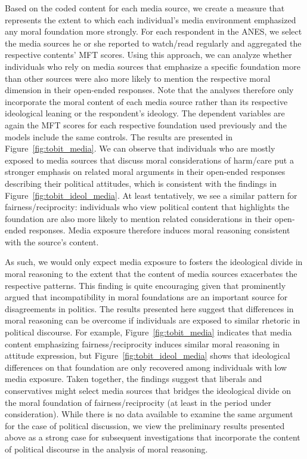 \documentclass[12pt]{article}
\begin{document}
Based on the coded content for each media source, we create a measure that represents the extent to which each individual's media environment emphasized any moral foundation more strongly. For each respondent in the ANES, we select the media sources he or she reported to watch/read regularly and aggregated the respective contents' MFT scores. Using this approach, we can analyze whether individuals who rely on media sources that emphasize a specific foundation more than other sources were also more likely to mention the respective moral dimension in their open-ended responses. Note that the analyses therefore only incorporate the moral content of each media source rather than its respective ideological leaning or the respondent's ideology.  The dependent variables are again the MFT scores for each respective foundation used previously and the models include the same controls. The results are presented in Figure~\ref{fig:tobit_media}. We can observe that individuals who are mostly exposed to media sources that discuss moral considerations of harm/care put a stronger emphasis on related moral arguments in their open-ended responses describing their political attitudes, which is consistent with the findings in Figure~\ref{fig:tobit_ideol_media}. At least tentatively, we see a similar pattern for fairness/reciprocity: individuals who view political content that highlights the foundation are also more likely to mention related considerations in their open-ended responses. Media exposure therefore induces moral reasoning consistent with the source's content.

As such, we would only expect media exposure to fosters the ideological divide in moral reasoning to the extent that the content of media sources exacerbates the respective patterns. This finding is quite encouraging given that \citet{haidt2012righteous} prominently argued that incompatibility in moral foundations are an important source for disagreements in politics. The results presented here suggest that differences in moral reasoning can be overcome if individuals are exposed to similar rhetoric in political discourse. For example, Figure~\ref{fig:tobit_media} indicates that media content emphasizing fairness/reciprocity induces similar moral reasoning in attitude expression, but Figure~\ref{fig:tobit_ideol_media} shows that ideological differences on that foundation are only recovered among individuals with low media exposure. Taken together, the findings suggest that liberals and conservatives might select media sources that bridges the ideological divide on the moral foundation of fairness/reciprocity (at least in the period under consideration). While there is no data available to examine the same argument for the case of political discussion, we view the preliminary results presented above as a strong case for subsequent investigations that incorporate the content of political discourse in the analysis of moral reasoning.
\end{document}
